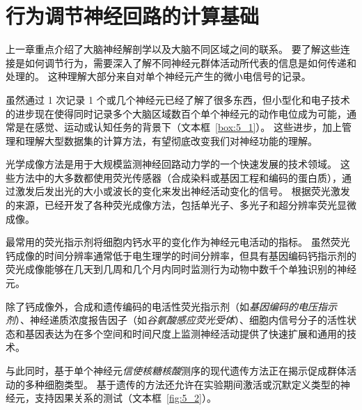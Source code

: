 \chapter{行为调节神经回路的计算基础} \label{chap:chap5}

上一章重点介绍了大脑神经解剖学以及大脑不同区域之间的联系。
要了解这些连接是如何调节行为，需要深入了解不同神经元群体活动所代表的信息是如何传递和处理的。
这种理解大部分来自对单个神经元产生的微小电信号的记录。


虽然通过 1 次记录 1 个或几个神经元已经了解了很多东西，但小型化和电子技术的进步现在使得同时记录多个大脑区域数百个单个神经元的动作电位成为可能，通常是在感觉、运动或认知任务的背景下（文本框~\ref{box:5_1}）。
这些进步，加上管理和理解大型数据集的计算方法，有望彻底改变我们对神经功能的理解。


\begin{proposition}[光学神经成像] \label{box:5_1}
	
	\quad \quad 光学成像方法是用于大规模监测神经回路动力学的一个快速发展的技术领域。
	这些方法中的大多数都使用荧光传感器（合成染料或基因工程和编码的蛋白质），通过激发后发出光的大小或波长的变化来发出神经活动变化的信号。
	根据荧光激发的来源，已经开发了各种荧光成像方法，包括单光子、多光子和超分辨率荧光显微成像。
	
	\quad \quad 最常用的荧光指示剂将细胞内钙水平的变化作为神经元电活动的指标。
	虽然荧光钙成像的时间分辨率通常低于电生理学的时间分辨率，但具有基因编码钙指示剂的荧光成像能够在几天到几周和几个月内同时监测行为动物中数千个单独识别的神经元。
	
	\quad \quad 除了钙成像外，合成和遗传编码的电活性荧光指示剂（如\textit{基因编码的电压指示剂}）、神经递质浓度报告因子（如\textit{谷氨酸感应荧光受体}）、细胞内信号分子的活性状态和基因表达为在多个空间和时间尺度上监测神经活动提供了快速扩展和通用的技术。
	
\end{proposition}


与此同时，基于单个神经元\textit{信使核糖核酸}测序的现代遗传方法正在揭示促成群体活动的多种细胞类型。
基于遗传的方法还允许在实验期间激活或沉默定义类型的神经元，支持因果关系的测试（文本框~\ref{fig:5_2}）。


